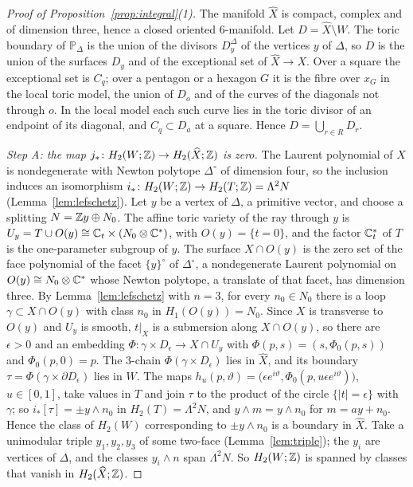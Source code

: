 \begin{proof}[Proof of Proposition~\ref{prop:integral}(1)]
The manifold $\widehat X$ is compact, complex and of dimension three, hence a closed oriented $6$-manifold. Let
$D=\widehat X\setminus W$. The toric boundary of $\mathbb P_\Delta$ is the union of the divisors $D^\Delta_y$ of the vertices $y$
of $\Delta$, so $D$ is the union of the surfaces $D_y$ and of the exceptional set of $\widehat X\to X$. Over a square the
exceptional set is $C_q$; over a pentagon or a hexagon $G$ it is the fibre over $x_G$ in the local toric model, the union of
$D_o$ and of the curves of the diagonals not through $o$. In the local model each such curve lies in the toric divisor of
an endpoint of its diagonal, and $C_q\subset D_a$ at a square. Hence $D=\bigcup_{r\in R}D_r$.

\emph{Step A: the map $j_*\colon H_2(W;\mathbb Z)\to H_2(\widehat X;\mathbb Z)$ is zero.} The Laurent polynomial of $X$ is nondegenerate
with Newton polytope $\Delta^\circ$ of dimension four, so the inclusion induces an isomorphism
$i_*\colon H_2(W;\mathbb Z)\to H_2(T;\mathbb Z)=\Lambda^2N$
(Lemma~\ref{lem:lefschetz}). Let $y$ be a vertex of $\Delta$, a primitive vector, and choose a splitting $N=\mathbb Z y\oplus N_0$.
The affine toric variety of the ray through $y$ is $U_y=T\cup O(y)\cong\mathbb C_t\times(N_0\otimes\mathbb C^*)$, with
$O(y)=\{t=0\}$, and the factor $\mathbb C^*_t$ of $T$ is the one-parameter subgroup of $y$. The surface $X\cap O(y)$ is the zero
set of the face polynomial of the facet $\{y\}^\circ$ of $\Delta^\circ$, a nondegenerate Laurent polynomial on
$O(y)\cong N_0\otimes\mathbb C^*$ whose Newton polytope, a translate of that facet, has dimension three. By
Lemma~\ref{lem:lefschetz} with $n=3$, for every $n_0\in N_0$ there is a loop $\gamma\subset X\cap O(y)$ with class
$n_0$ in $H_1(O(y))=N_0$. Since $X$ is transverse to $O(y)$ and $U_y$ is smooth, $t|_X$ is a submersion along
$X\cap O(y)$, so there are $\epsilon>0$ and an embedding $\Phi\colon\gamma\times D_\epsilon\to X\cap U_y$ with
$\Phi(p,s)=(s,\Phi_0(p,s))$ and $\Phi_0(p,0)=p$. The $3$-chain $\Phi(\gamma\times D_\epsilon)$ lies in
$\widehat X$, and its boundary $\tau=\Phi(\gamma\times\partial D_\epsilon)$ lies in $W$. The maps
$h_u(p,\vartheta)=\bigl(\epsilon e^{i\vartheta},\Phi_0(p,u\epsilon e^{i\vartheta})\bigr)$, $u\in[0,1]$, take values in $T$ and
join $\tau$ to the product of the circle $\{|t|=\epsilon\}$ with $\gamma$; so $i_*[\tau]=\pm y\wedge n_0$ in
$H_2(T)=\Lambda^2N$, and $y\wedge m=y\wedge n_0$ for $m=ay+n_0$. Hence the class of $H_2(W)$ corresponding to $\pm y\wedge n_0$ is a boundary in $\widehat X$. Take a
unimodular triple $y_1,y_2,y_3$ of some two-face (Lemma~\ref{lem:triple}); the $y_i$ are vertices of $\Delta$, and the
classes $y_i\wedge n$ span $\Lambda^2N$. So $H_2(W;\mathbb Z)$ is spanned by classes that vanish in $H_2(\widehat X;\mathbb Z)$.


\end{proof}
